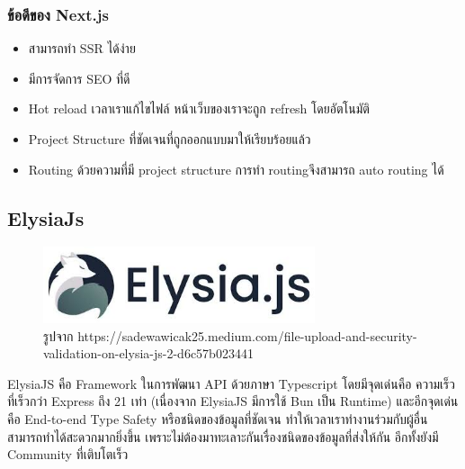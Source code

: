 \subsubsection{ข้อดีของ Next.js}
\begin{itemize}
  \item สามารถทำ SSR ได้ง่าย
  \item มีการจัดการ SEO ที่ดี
  \item Hot reload เวลาเราแก้ไขไฟล์ หน้าเว็บของเราจะถูก refresh โดยอัตโนมัติ 
  \item Project Structure ที่ชัดเจนที่ถูกออกแบบมาให้เรียบร้อยแล้ว
  \item Routing ด้วยความที่มี project structure การทำ routingจึงสามารถ auto routing ได้
\end{itemize}


\subsection{ElysiaJs}
\begin{figure}[H] %
    \centering
    \includegraphics[width=80mm, keepaspectratio ]{pictures/elysia.jpg}
    \caption[Poem]{รูปจาก https://sadewawicak25.medium.com/file-upload-and-security-validation-on-elysia-js-2-d6c57b023441}
    \label{fig:elysia}
\end{figure}
\hspace{1.27cm}ElysiaJS\cite{ElysiaJs} คือ Framework ในการพัฒนา API ด้วยภาษา Typescript โดยมีจุดเด่นคือ ความเร็วที่เร็วกว่า Express ถึง 21 เท่า (เนื่องจาก ElysiaJS มีการใช้ Bun เป็น Runtime) และอีกจุดเด่นคือ End-to-end Type Safety หรือชนิดของข้อมูลที่ชัดเจน ทำให้เวลาเราทำงานร่วมกับผู้อื่นสามารถทำได้สะดวกมากยิ่งขึ้น เพราะไม่ต้องมาทะเลาะกันเรื่องชนิดของข้อมูลที่ส่งให้กัน อีกทั้งยังมี Community ที่เติบโตเร็ว


